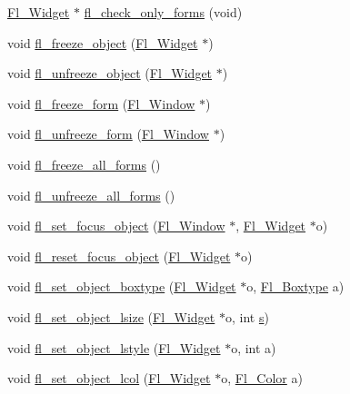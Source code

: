 \begin{DoxyCompactItemize}
\item 
\hyperlink{class_fl___widget}{Fl\+\_\+\+Widget} $\ast$ \hyperlink{forms_8_h_a638552b57c7ad1b08914b7f74fe38edf}{fl\+\_\+check\+\_\+only\+\_\+forms} (void)
\item 
void \hyperlink{forms_8_h_a2657a2259d49c9caec04324ef818e37b}{fl\+\_\+freeze\+\_\+object} (\hyperlink{class_fl___widget}{Fl\+\_\+\+Widget} $\ast$)
\item 
void \hyperlink{forms_8_h_a5028d11d2b292660ddcf30f00487c1dd}{fl\+\_\+unfreeze\+\_\+object} (\hyperlink{class_fl___widget}{Fl\+\_\+\+Widget} $\ast$)
\item 
void \hyperlink{forms_8_h_a5438c0f9e1778358ec9af03192111fd1}{fl\+\_\+freeze\+\_\+form} (\hyperlink{class_fl___window}{Fl\+\_\+\+Window} $\ast$)
\item 
void \hyperlink{forms_8_h_a6bbf4671180627456794d754afe7a589}{fl\+\_\+unfreeze\+\_\+form} (\hyperlink{class_fl___window}{Fl\+\_\+\+Window} $\ast$)
\item 
void \hyperlink{forms_8_h_a66a9153287a55cf06eab85638d81ac69}{fl\+\_\+freeze\+\_\+all\+\_\+forms} ()
\item 
void \hyperlink{forms_8_h_af9500462ebd443942c50d97edc7d3473}{fl\+\_\+unfreeze\+\_\+all\+\_\+forms} ()
\item 
void \hyperlink{forms_8_h_a4c8e652977518e3eb6d8e6417de34fa1}{fl\+\_\+set\+\_\+focus\+\_\+object} (\hyperlink{class_fl___window}{Fl\+\_\+\+Window} $\ast$, \hyperlink{class_fl___widget}{Fl\+\_\+\+Widget} $\ast$o)
\item 
void \hyperlink{forms_8_h_ae1c4499ba3f67fba6a9f26e7b073bac0}{fl\+\_\+reset\+\_\+focus\+\_\+object} (\hyperlink{class_fl___widget}{Fl\+\_\+\+Widget} $\ast$o)
\item 
void \hyperlink{forms_8_h_a0878a09d17088499feabcf69bb845e89}{fl\+\_\+set\+\_\+object\+\_\+boxtype} (\hyperlink{class_fl___widget}{Fl\+\_\+\+Widget} $\ast$o, \hyperlink{_enumerations_8_h_ae48bf9070f8541de17829f54ccacc6bc}{Fl\+\_\+\+Boxtype} a)
\item 
void \hyperlink{forms_8_h_a055f2d6f2f25a58ea2b74fc1855d0034}{fl\+\_\+set\+\_\+object\+\_\+lsize} (\hyperlink{class_fl___widget}{Fl\+\_\+\+Widget} $\ast$o, int \hyperlink{forms_8_h_a672b4f0a8c8a6db61068c721f799d87f}{s})
\item 
void \hyperlink{forms_8_h_a442a754de4d12dbde7633b179d53f324}{fl\+\_\+set\+\_\+object\+\_\+lstyle} (\hyperlink{class_fl___widget}{Fl\+\_\+\+Widget} $\ast$o, int a)
\item 
void \hyperlink{forms_8_h_a0c5b4fcea85cf32fe17d7a8a4835b76c}{fl\+\_\+set\+\_\+object\+\_\+lcol} (\hyperlink{class_fl___widget}{Fl\+\_\+\+Widget} $\ast$o, \hyperlink{_enumerations_8_h_a8b762953646f8abee866061f1af78a6a}{Fl\+\_\+\+Color} a)

\end{DoxyCompactItemize}

